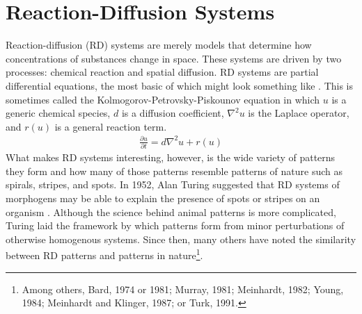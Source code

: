 \chapter{Reaction-Diffusion Systems}

	Reaction-diffusion (RD) systems are merely models that determine how concentrations of substances change in space. These systems are driven by two processes: chemical reaction and spatial diffusion. RD systems are partial differential equations, the most basic of which might look something like . This is sometimes called the Kolmogorov-Petrovsky-Piskounov equation in which $u$ is a generic chemical species, $d$ is a diffusion coefficient, $\nabla^2 u$ is the Laplace operator, and $r(u)$ is a general reaction term.
	\begin{align}
		\frac{\partial u}{\partial t} = d \nabla^2 u + r(u)
		\label{eq:KPP}
	\end{align}
What makes RD systems interesting, however, is the wide variety of patterns they form and how many of those patterns resemble patterns of nature such as spirals, stripes, and spots. In 1952, Alan Turing suggested that RD systems of morphogens may be able to explain the presence of spots or stripes on an organism . Although the science behind animal patterns is more complicated, Turing laid the framework by which patterns form from minor perturbations of otherwise homogenous systems. Since then, many others have noted the similarity between RD patterns and patterns in nature\footnote{Among others, Bard, 1974 or 1981; Murray, 1981; Meinhardt, 1982; Young, 1984; Meinhardt and Klinger, 1987; or Turk, 1991.}.
	
	
